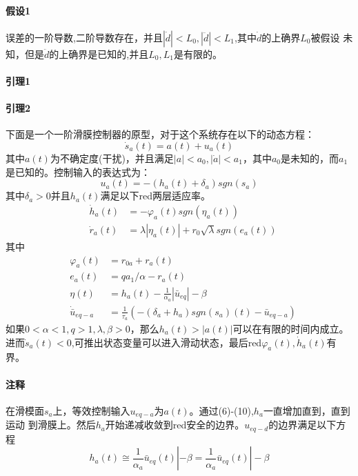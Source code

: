 \documentclass{cjc}
\begin{document}
    \paragraph{假设1}
    误差的一阶导数,二阶导数存在，并且$|\dot{d}|<L_0,|\ddot{d}|<L_1$,其中$\dot{d}$的上确界$L_0$被假设
    未知，但是$\ddot{d}$的上确界是已知的,并且$L_0,L_1$是有限的。
    
    \paragraph{引理1}

    \paragraph{引理2}
    下面是一个一阶滑膜控制器的原型，对于这个系统存在以下的动态方程：
    \begin{equation}
      \dot{s}_a(t) = a(t) + u_a(t)
    \end{equation}  
    其中$a(t)$为不确定度(干扰)，并且满足$|a|<a_0,|\dot{a}|<a_1$，其中$a_0$是未知的，而$a_1$
    是已知的。控制输入的表达式为：
    \begin{equation}
      u_a(t) = -(h_a(t) +\delta _a)sgn(s_a)
    \end{equation}
    其中$\delta _a> 0 $并且$h_a(t)$满足以下{{red}两层适应率}。
    \begin{eqnarray}
      &\dot{h}_a(t) &= - \varphi_a (t) sgn(\eta  _a(t))  \\
      &\dot{r}_a(t) &= \lambda  |\eta_a (t)| + r_0 \sqrt{\lambda  }sgn(e_a(t))
    \end{eqnarray}
    其中\:
    \begin{eqnarray}  
      &\varphi_a (t) &= r_{0a} + r_a(t) \\
      &e_a(t)& = q a_1/\alpha  - r_a(t) \\
      &\eta  (t) &= h_a(t) - \frac{1}{\alpha_a}|\bar{u}_{eq}| - \beta \\
      &\dot{\bar{u}}_{eq-a} &= \frac{1}{\tau _a}(-(\delta_a + h_a )sgn(s_a)(t)-\bar{u}_{eq-a})
    \end{eqnarray}
    如果$0<\alpha <1,q>1,\lambda ,\beta >0$，那么$h_a(t)>|a(t)|$可以在有限的时间内成立。
    进而$\dot{s}_a(t)<0$,可推出状态变量可以进入滑动状态，最后{{red}$\varphi_a (t),\dot{h}_a(t)$有界}。
    
    \paragraph{注释}
    在滑模面$s_a$上，等效控制输入$u_{eq-a}$为$a(t)$。通过(6)-(10),$h_a$一直增加直到，直到运动
    到滑膜上。然后$h_a$开始递减收敛到{{red}安全的边界}。$u_{eq-d}$的边界满足以下方程\:
    \begin{equation}
      h_a(t) \cong \frac{1}{\alpha _a}\bar{u}_{eq}(t)| -\beta 
      =\frac{1}{\alpha _a}\bar{u}_{eq}(t)| -\beta
    \end{equation}
    
\end{document}
